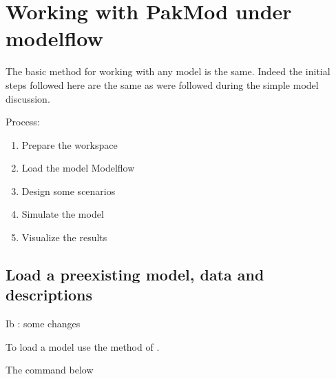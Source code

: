 \documentclass[letterpaper,10pt,english]{jupyterBook}
\begin{document}
\section{Working with PakMod under modelflow}
\label{\detokenize{content/06_WBModels/LoadingWBModel:working-with-pakmod-under-modelflow}}
\sphinxAtStartPar
The basic method for working with any model is the same. Indeed the initial steps followed here are the same as were followed during the simple model discussion.

\sphinxAtStartPar
Process:
\begin{enumerate}
%
\item {} 
\sphinxAtStartPar
Prepare the workspace

\item {} 
\sphinxAtStartPar
Load the model Modelflow

\item {} 
\sphinxAtStartPar
Design some scenarios

\item {} 
\sphinxAtStartPar
Simulate the model

\item {} 
\sphinxAtStartPar
Visualize the results

\end{enumerate}


\subsection{Load a pre\sphinxhyphen{}existing model, data and descriptions}
\label{\detokenize{content/06_WBModels/LoadingWBModel:load-a-pre-existing-model-data-and-descriptions}}
\sphinxAtStartPar
Ib : some changes 

\sphinxAtStartPar
To load a model use the  method of .

\sphinxAtStartPar
The command below

\begin{sphinxVerbatim}[commandchars=\\\{\}]
    
\end{sphinxVerbatim}
\end{document}
